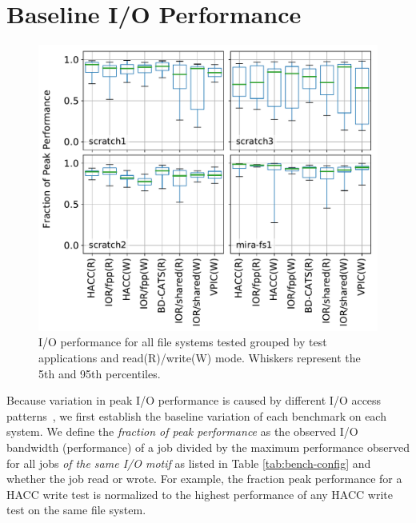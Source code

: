 \section{Baseline I/O Performance} \label{sec:results}

\begin{figure}[t]
    \centering
    \includegraphics[width=1.0\columnwidth]{figs/perf-boxplots.pdf}
    \vspace{-.25in}
    \caption{I/O performance for all file systems tested grouped by test
    applications and read(R)/write(W) mode.  Whiskers represent the 5th and 95th
    percentiles.}
    \label{fig:perf-summary-boxplots-motif}
	\vspace{-.3in}
\end{figure}

Because variation in peak I/O performance is caused by different I/O access patterns~\cite{Lofstead2010,Uselton2010,Xie2012}, we first establish the baseline variation of each benchmark on each system.
We define the \emph{fraction of peak performance} as the observed I/O bandwidth (performance) of a job divided by the maximum performance observed for all jobs \emph{of the same I/O motif} as listed in Table \ref{tab:bench-config} and whether the job read or wrote.
For example, the fraction peak performance for a HACC write test is normalized to the highest performance of any HACC write test on the same file system.

